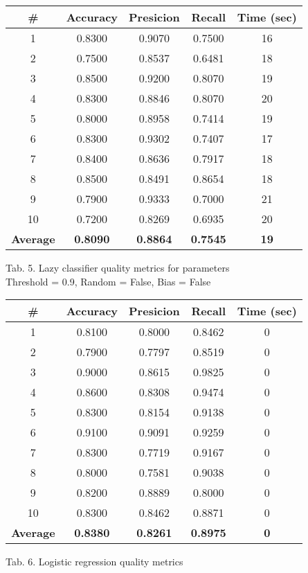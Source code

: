 \documentclass{article}
\begin{document}
\begin{center}
    \begin{tabular}{|c|c|c|c|c|}
        \hline
        \# & \textbf{Accuracy} & \textbf{Presicion} & \textbf{Recall} & \textbf{Time (sec)} \\
        \hline
        1	& 0.8300	& 0.9070	& 0.7500	& 16 \\
        2	& 0.7500	& 0.8537	& 0.6481	& 18 \\
        3	& 0.8500	& 0.9200	& 0.8070	& 19 \\
        4	& 0.8300	& 0.8846	& 0.8070	& 20 \\
        5	& 0.8000	& 0.8958	& 0.7414	& 19 \\
        6	& 0.8300	& 0.9302	& 0.7407	& 17 \\
        7	& 0.8400	& 0.8636	& 0.7917	& 18 \\
        8	& 0.8500	& 0.8491	& 0.8654	& 18 \\
        9	& 0.7900	& 0.9333	& 0.7000	& 21 \\
        10	& 0.7200	& 0.8269	& 0.6935	& 20 \\
        \hline
        \textbf{Average} & \textbf{0.8090} & \textbf{0.8864} & \textbf{0.7545} & \textbf{19} \\
        \hline
    \end{tabular}
    
    Tab. 5. Lazy classifier quality metrics for parameters \\ Threshold = 0.9, Random = False, Bias = False
\end{center}

\begin{center}
    \begin{tabular}{|c|c|c|c|c|}
        \hline
        \# & \textbf{Accuracy} & \textbf{Presicion} & \textbf{Recall} & \textbf{Time (sec)} \\
        \hline
        1	& 0.8100	& 0.8000	& 0.8462	& 0 \\
        2	& 0.7900	& 0.7797	& 0.8519	& 0 \\
        3	& 0.9000	& 0.8615	& 0.9825	& 0 \\
        4	& 0.8600	& 0.8308	& 0.9474	& 0 \\
        5	& 0.8300	& 0.8154	& 0.9138	& 0 \\
        6	& 0.9100	& 0.9091	& 0.9259	& 0 \\
        7	& 0.8300	& 0.7719	& 0.9167	& 0 \\
        8	& 0.8000	& 0.7581	& 0.9038	& 0 \\
        9	& 0.8200	& 0.8889	& 0.8000	& 0 \\
        10	& 0.8300	& 0.8462	& 0.8871	& 0 \\
        \hline
        \textbf{Average} & \textbf{0.8380} & \textbf{0.8261} & \textbf{0.8975} & \textbf{0} \\
        \hline
    \end{tabular}
    
    Tab. 6. Logistic regression quality metrics
\end{center}
\end{document}
